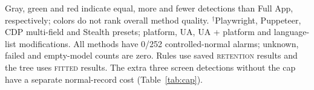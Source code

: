\begin{table}[t]
  \par\smallskip
  \begin{minipage}{\textwidth}\footnotesize
  Gray, green and red indicate equal, more and fewer detections than Full App, respectively; colors do not rank overall method quality.
  $^{\dagger}$Playwright, Puppeteer, CDP multi-field and Stealth presets; platform, UA, UA + platform and language-list modifications.
  All methods have 0/252 controlled-normal alarms; unknown, failed and empty-model counts are zero.
  Rules use saved \textsc{retention} results and the tree uses \textsc{fitted} results. The extra three screen detections without the cap have a separate normal-record cost (Table~\ref{tab:cap}).
  \end{minipage}
\end{table}

